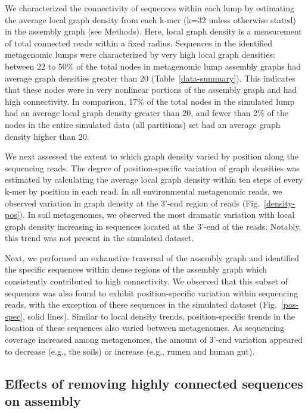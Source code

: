 \documentclass[10pt]{article}
\begin{document}
We characterized the connectivity of sequences
within each lump by estimating the average local graph density from
each k-mer (k=32 unless otherwise stated) in the assembly graph (see
Methods).  Here, local graph density is a measurement of total
connected reads within a fixed radius.  Sequences
in the identified metagenomic lumps were characterized by very high
local graph densities: between 22 to 50\% of the total nodes in
metagenomic lump assembly graphs had average graph densities greater
than 20 (Table~\ref{data-summary}).  This indicates that these nodes were in very nonlinear portions of the assembly graph and had high connectivity.  In comparison, 17\% of the total nodes in the
simulated lump had an average local graph density greater than 20, and
fewer than 2\% of the nodes in the entire simulated data (all partitions) set had an
average graph density higher than 20.

We next assessed the extent to which graph density varied by position
along the sequencing reads.  The degree of position-specific variation of
graph densities was estimated by calculating the average local graph
density within ten steps of every k-mer by position in each read.  In
all environmental metagenomic reads, we observed variation in graph
density at the 3'-end region of reads (Fig.~\ref{density-pos}).  In soil
metagenomes, we observed the most dramatic variation with local graph
density increasing in sequences located at the 3'-end of the reads.
Notably, this trend was not present in the simulated dataset.

Next, we performed an exhaustive traversal of the assembly graph and
identified the specific sequences within dense regions of the assembly
graph which consistently contributed to high connectivity.  We
observed that this subset of sequences was also found to exhibit
position-specific variation within sequencing reads, with the
exception of these sequences in the simulated dataset (Fig.~\ref{pos-spec}, solid
lines).  Similar to local density trends, position-specific trends in
the location of these sequences also varied between metagenomes.  As
sequencing coverage increased among metagenomes, the amount of 3'-end
variation appeared to decrease (e.g., the soils) or increase (e.g.,
rumen and human gut).

\subsection*{Effects of removing highly connected sequences on assembly}
\end{document}
